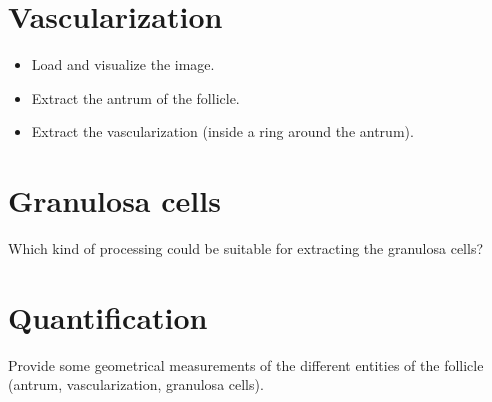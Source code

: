 \vspace*{-15pt}

\section{Vascularization}
\vspace*{-10pt}
\begin{qbox}
\begin{itemize}
	\item Load and visualize the image.
	\item Extract the antrum of the follicle.
	\item Extract the vascularization (inside a ring around the antrum).
\end{itemize}
\end{qbox}

\vspace*{-10pt}
\section{Granulosa cells}
\vspace*{-10pt}
\begin{qbox}
Which kind of processing could be suitable for extracting the granulosa cells?
\end{qbox}

\vspace*{-10pt}
\section{Quantification}
\vspace*{-10pt}
\begin{qbox}
Provide some geometrical measurements of the different entities of the follicle (antrum, vascularization, granulosa cells).
\end{qbox}
